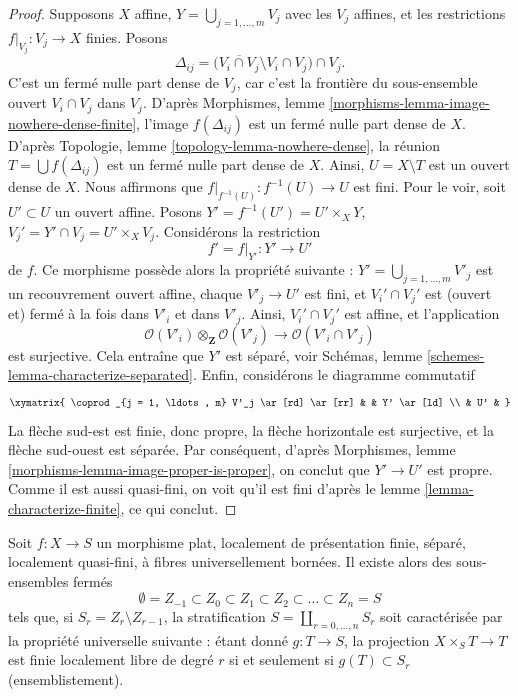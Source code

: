 \begin{proof}
\medskip\noindent
Supposons $X$ affine, $Y = \bigcup_{j = 1, \ldots, m} V_j$ avec les $V_j$ affines,
et les restrictions $f|_{V_j} : V_j \to X$ finies.
Posons
$$
\Delta_{ij} =
\Big(\overline{V_i \cap V_j} \setminus V_i \cap V_j\Big) \cap V_j.
$$
C'est un fermé nulle part dense de $V_j$, car c'est la frontière
du sous-ensemble ouvert $V_i \cap V_j$ dans $V_j$. D'après
Morphismes, lemme \ref{morphisms-lemma-image-nowhere-dense-finite},
l'image $f(\Delta_{ij})$ est un fermé nulle part dense de $X$. D'après
Topologie, lemme \ref{topology-lemma-nowhere-dense},
la réunion $T = \bigcup f(\Delta_{ij})$ est un fermé nulle part dense
de $X$. Ainsi, $U = X \setminus T$ est un ouvert dense de $X$.
Nous affirmons que $f|_{f^{-1}(U)} : f^{-1}(U) \to U$ est fini.
Pour le voir, soit $U' \subset U$ un ouvert affine.
Posons $Y' = f^{-1}(U') = U' \times_X Y$,
$V_j' = Y' \cap V_j = U' \times_X V_j$. Considérons la restriction
$$
f' = f|_{Y'} : Y' \longrightarrow U'
$$
de $f$. Ce morphisme possède alors la propriété suivante :
$Y' = \bigcup_{j = 1, \ldots, m} V'_j$ est un recouvrement ouvert affine,
chaque $V'_j \to U'$ est fini, et $V_i' \cap V_j'$ est (ouvert et) fermé
à la fois dans $V'_i$ et dans $V'_j$. Ainsi, $V_i' \cap V_j'$ est affine, et l'application
$$
\mathcal{O}(V'_i) \otimes_{\mathbf{Z}} \mathcal{O}(V'_j)
\longrightarrow
\mathcal{O}(V'_i \cap V'_j)
$$
est surjective. Cela entraîne que $Y'$ est séparé, voir
Schémas, lemme \ref{schemes-lemma-characterize-separated}.
Enfin, considérons le diagramme commutatif
$$
\xymatrix{
\coprod_{j = 1, \ldots, m} V'_j \ar[rd] \ar[rr] & & Y' \ar[ld] \\
& U' &
}
$$
La flèche sud-est est finie, donc propre, la flèche horizontale est
surjective, et la flèche sud-ouest est séparée. Par conséquent, d'après
Morphismes, lemme \ref{morphisms-lemma-image-proper-is-proper},
on conclut que $Y' \to U'$ est propre. Comme il est aussi quasi-fini,
on voit qu'il est fini d'après le lemme \ref{lemma-characterize-finite},
ce qui conclut.
\end{proof}

\begin{lemma}
\label{lemma-stratify-flat-fp-lqf-universally-bounded}
Soit $f : X \to S$ un morphisme plat, localement de présentation finie, séparé,
localement quasi-fini, à fibres universellement bornées. Il existe alors
des sous-ensembles fermés
$$
\emptyset = Z_{-1} \subset Z_0 \subset Z_1 \subset Z_2 \subset
\ldots \subset Z_n = S
$$
tels que, si $S_r = Z_r \setminus Z_{r - 1}$, la stratification
$S = \coprod_{r = 0, \ldots, n} S_r$ soit caractérisée par la propriété
universelle suivante : étant donné $g : T \to S$, la projection
$X \times_S T \to T$ est finie localement libre
de degré $r$ si et seulement si $g(T) \subset S_r$ (ensemblistement).
\end{lemma}


